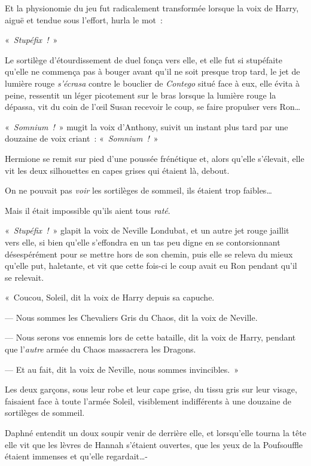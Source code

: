 Et la physionomie du jeu fut radicalement transformée lorsque la voix de Harry, aiguë et tendue sous l'effort, hurla le mot~:

«~\emph{Stupéfix~!}~»

Le sortilège d'étourdissement de duel fonça vers elle, et elle fut si stupéfaite qu'elle ne commença pas à bouger avant qu'il ne soit presque trop tard, le jet de lumière rouge \emph{s'écrasa} contre le bouclier de \emph{Contego} situé face à eux, elle évita à peine, ressentit un léger picotement sur le bras lorsque la lumière rouge la dépassa, vit du coin de l'œil Susan recevoir le coup, se faire propulser vers Ron…

«~\emph{Somnium~!}~» mugit la voix d'Anthony, suivit un instant plus tard par une douzaine de voix criant~: «~\emph{Somnium~!}~»

Hermione se remit sur pied d'une poussée frénétique et, alors qu'elle s'élevait, elle vit les deux silhouettes en capes grises qui étaient là, debout.

On ne pouvait pas \emph{voir} les sortilèges de sommeil, ils étaient trop faibles…

Mais il était impossible qu'ils aient tous \emph{raté}.

«~\emph{Stupéfix~!}~» glapit la voix de Neville Londubat, et un autre jet rouge jaillit vers elle, si bien qu'elle s'effondra en un tas peu digne en se contorsionnant désespérément pour se mettre hors de son chemin, puis elle se releva du mieux qu'elle put, haletante, et vit que cette fois-ci le coup avait eu Ron pendant qu'il se relevait.

«~Coucou, Soleil, dit la voix de Harry depuis sa capuche.

--- Nous sommes les Chevaliers Gris du Chaos, dit la voix de Neville.

--- Nous serons vos ennemis lors de cette bataille, dit la voix de Harry, pendant que l'\emph{autre} armée du Chaos massacrera les Dragons.

--- Et au fait, dit la voix de Neville, nous sommes invincibles.~»

\later

Les deux garçons, sous leur robe et leur cape grise, du tissu gris sur leur visage, faisaient face à toute l'armée Soleil, visiblement indifférents à une douzaine de sortilèges de sommeil.

Daphné entendit un doux soupir venir de derrière elle, et lorsqu'elle tourna la tête elle vit que les lèvres de Hannah s'étaient ouvertes, que les yeux de la Poufsouffle étaient immenses et qu'elle regardait…-

